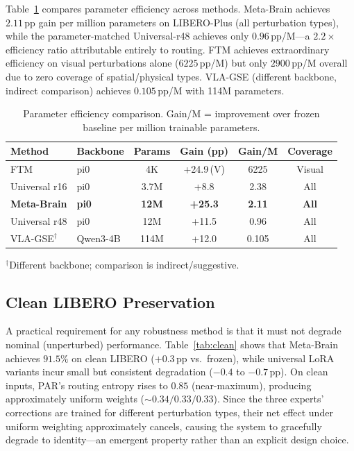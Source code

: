 \documentclass[10pt,twocolumn]{article}
\newcommand{\ours}{Meta-Brain}
\newcommand{\liplus}{LIBERO-Plus}
\newcommand{\pp}{\,\text{pp}}
\begin{document}
Table~\ref{tab:param_efficiency} compares parameter efficiency across methods.
\ours{} achieves $2.11\pp$ gain per million parameters on \liplus{} (all perturbation types), while the parameter-matched Universal-r48 achieves only $0.96\pp$/M---a $2.2\times$ efficiency ratio attributable entirely to routing.
FTM achieves extraordinary efficiency on visual perturbations alone ($6225\pp$/M) but only $2900\pp$/M overall due to zero coverage of spatial/physical types.
VLA-GSE (different backbone, indirect comparison) achieves $0.105\pp$/M with 114M parameters.

\begin{table}[t]
\centering
\caption{Parameter efficiency comparison. Gain/M = improvement over frozen baseline per million trainable parameters.}
\label{tab:param_efficiency}
\small
\begin{tabular}{@{}llcccc@{}}
\toprule
Method & Backbone & Params & Gain (pp) & Gain/M & Coverage \\
\midrule
FTM & pi0 & 4K & +24.9\,(V) & 6225 & Visual \\
Universal r16 & pi0 & 3.7M & +8.8 & 2.38 & All \\
\textbf{\ours{}} & \textbf{pi0} & \textbf{12M} & \textbf{+25.3} & \textbf{2.11} & \textbf{All} \\
Universal r48 & pi0 & 12M & +11.5 & 0.96 & All \\
VLA-GSE$^\dagger$ & Qwen3-4B & 114M & +12.0 & 0.105 & All \\
\bottomrule
\end{tabular}
\vspace{-2mm}
\begin{flushleft}
\scriptsize{$^\dagger$Different backbone; comparison is indirect/suggestive.}
\end{flushleft}
\end{table}


\subsection{Clean LIBERO Preservation}
\label{sec:clean}

A practical requirement for any robustness method is that it must not degrade nominal (unperturbed) performance.
Table~\ref{tab:clean} shows that \ours{} achieves $91.5\%$ on clean LIBERO ($+0.3\pp$ vs.\ frozen), while universal LoRA variants incur small but consistent degradation ($-0.4$ to $-0.7\pp$).
On clean inputs, PAR's routing entropy rises to $0.85$ (near-maximum), producing approximately uniform weights (${\sim}0.34/0.33/0.33$).
Since the three experts' corrections are trained for different perturbation types, their net effect under uniform weighting approximately cancels, causing the system to gracefully degrade to identity---an emergent property rather than an explicit design choice.
\end{document}
